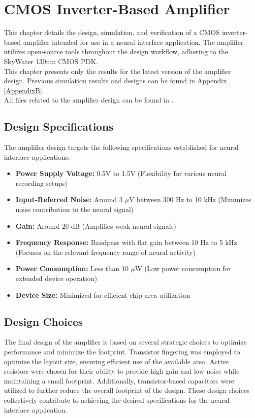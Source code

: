 \chapter{CMOS Inverter-Based Amplifier}
\label{chap:amplifier}

This chapter details the design, simulation, and verification of a CMOS inverter-based amplifier intended for use in a neural interface application. The amplifier utilizes open-source tools throughout the design workflow, adhering to the SkyWater 130nm CMOS PDK.
\\
This chapter presents only the results for the latest version of the amplifier design. Previous simulation results and designs can be found in Appendix \ref{AppendixB}.
\\
All files related to the amplifier design can be found in \textcite{miguelcorrea0107_2024}.

\section{Design Specifications}

The amplifier design targets the following specifications established for neural interface applications:

\begin{itemize}
\item \textbf{Power Supply Voltage:} 0.5V to 1.5V (Flexibility for various neural recording setups)
\item \textbf{Input-Referred Noise:} Around 3 $\mu$V between 300 Hz to 10 kHz (Minimizes noise contribution to the neural signal)
\item \textbf{Gain:} Around 20 dB (Amplifies weak neural signals)
\item \textbf{Frequency Response:} Bandpass with flat gain between 10 Hz to 5 kHz (Focuses on the relevant frequency range of neural activity)
\item \textbf{Power Consumption:} Less than 10 $\mu$W (Low power consumption for extended device operation)
\item \textbf{Device Size:} Minimized for efficient chip area utilization
\end{itemize}

\section{Design Choices}
The final design of the amplifier is based on several strategic choices to optimize performance and minimize the footprint. 
Transistor fingering was employed to optimize the layout size, ensuring efficient use of the available area. 
Active resistors were chosen for their ability to provide high gain and low noise while maintaining a small footprint. 
Additionally, transistor-based capacitors were utilized to further reduce the overall footprint of the design. 
These design choices collectively contribute to achieving the desired specifications for the neural interface application.

